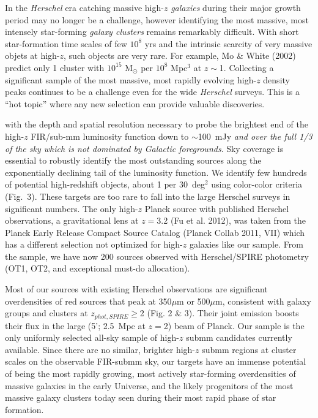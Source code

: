 \documentclass[11pt,a4]{article}
\begin{document}
In the {\it Herschel} era catching massive high-$z$ {\it galaxies}
during their major growth period may no longer be a challenge, however
identifying the most massive, most intensely star-forming {\it galaxy
  clusters} remains remarkably difficult. With short star-formation
time scales of few $10^8$ yrs and the intrinsic scarcity of very
massive objets at high-$z$, such objects are very rare. For example,
Mo \& White (2002) predict only 1 cluster with $10^{15}$ M$_{\odot}$
per $10^8$ Mpc$^3$ at $z\sim$1. Collecting a significant sample of the
most massive, most rapidly evolving high-$z$ density peaks continues
to be a challenge even for the wide {\it Herschel} surveys. This is a
``hot topic'' where any new selection can provide valuable
discoveries.

\vspace{2mm}

 with
the depth and spatial resolution necessary to probe the brightest end
of the high-$z$ FIR/sub-mm luminosity function down to $\sim$100~mJy
{\it and over the full 1/3 of the sky which is not dominated by
  Galactic foregrounds}. Sky coverage is essential to robustly
identify the most outstanding sources along the exponentially
declining tail of the luminosity function. We identify few hundreds of
potential high-redshift objects, about 1 per 30~deg$^{2}$ using
color-color criteria (Fig.~3). These targets are too rare to fall into
the large Herschel surveys in significant numbers. The only high-$z$
Planck source with published Herschel observations, a gravitational
lens at $z=$3.2 (Fu et al. 2012), was taken from the Planck Early
Release Compact Source Catalog (Planck Collab 2011, VII) which has a
different selection not optimized for high-$z$ galaxies like our
sample. From the sample, we have now 200 sources observed with
Herschel/SPIRE photometry (OT1, OT2, and exceptional must-do
allocation).

Most of our sources with existing Herschel observations are
significant overdensities of red sources that peak at 350$\mu$m or
500$\mu$m, consistent with galaxy groups and clusters at
$z_{phot,SPIRE}\ge$2 (Fig. 2 \& 3). Their joint emission boosts their
flux in the large (5'; 2.5~Mpc at $z=$2) beam of Planck. Our sample is
the only uniformly selected all-sky sample of high-$z$ submm candidates
currently available. Since there are no similar, brighter high-$z$ submm
regions at cluster scales on the observable FIR-submm sky, our
targets have an immense potential of being the most rapidly growing,
most actively star-forming overdensities of massive galaxies in the
early Universe, and the likely progenitors of the most massive galaxy
clusters today seen during their most rapid phase of star formation.
\end{document}
